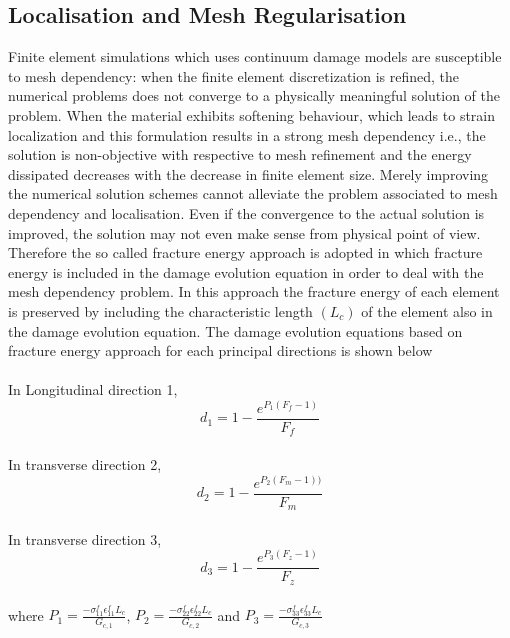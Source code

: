 \documentclass[a4paper,12pt]{extarticle}
\begin{document}
\subsection{Localisation and Mesh Regularisation}\label{Mesh Regularisation}
\indent\indent\indent Finite element simulations which uses continuum damage models are susceptible to mesh dependency: when the finite element discretization  is refined, the numerical problems does not converge to a physically meaningful solution of the problem. When the material exhibits softening behaviour, which leads to strain localization and this formulation results in a strong mesh dependency i.e., the solution is non-objective with respective to mesh refinement and the energy dissipated  decreases with the decrease in finite element size. Merely improving the numerical solution schemes cannot alleviate the problem associated to mesh dependency and localisation. Even if the convergence to the actual solution is improved, the solution may not even make sense from physical point of view. Therefore the so called fracture energy approach is adopted in which fracture energy is included in the damage evolution equation in order to deal with the mesh dependency problem. In this approach the fracture energy of each element is preserved by including the characteristic length $(L_{c})$ of the element also in the damage evolution equation. The damage evolution equations based on fracture energy approach for each principal directions is shown below
\\
\\
In Longitudinal direction 1,
\begin{equation}
d_{1} = 1 - \frac{e^{P_{1}(F_{f} - 1)}}{F_{f}}
\label{d1}   
\end{equation}
\\
In transverse direction 2,
\begin{equation}
d_{2} = 1 - \frac{e^{P_{2}(F_{m} - 1))}}{F_{m}}
\label{d2}   
\end{equation}
\\
In transverse direction 3,
\begin{equation}
d_{3} = 1 - \frac{e^{P_{3}(F_{z} - 1)}}{F_{z}}
\label{d3}   
\end{equation}
\\
where $P_{1} = \frac{-\sigma_{11}^{f}\epsilon_{11}^{f}L_{c}}{G_{c,1}}$, $P_{2} = \frac{-\sigma_{22}^{f}\epsilon_{22}^{f}L_{c}}{G_{c,2}}$ and $P_{3} = \frac{-\sigma_{33}^{f}\epsilon_{33}^{f}L_{c}}{G_{c,3}}$ 

\vspace*{1cm}
\end{document}
